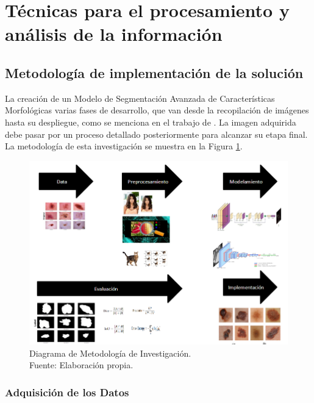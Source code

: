 \section{Técnicas para el procesamiento y análisis de la información}

\subsection{Metodología de implementación de la solución}

La creación de un Modelo de Segmentación Avanzada de Características Morfológicas varias fases de desarrollo, que van desde la recopilación de imágenes hasta su despliegue, como se menciona en el trabajo de \cite{yoon2023}. La imagen adquirida debe pasar por un proceso detallado posteriormente para alcanzar su etapa final. La metodología de esta investigación se muestra en la Figura \ref{3:fig3}.

\begin{figure}[h]
	\begin{center}
		\includegraphics[width=1\textwidth]{3/figures/metodologia.png}
		\caption[Diagrama de Metodología de Investigación]{Diagrama de Metodología de Investigación.\\
			Fuente: Elaboración propia.}
		\label{3:fig3}
	\end{center}
\end{figure}


\subsubsection{Adquisición de los Datos}

